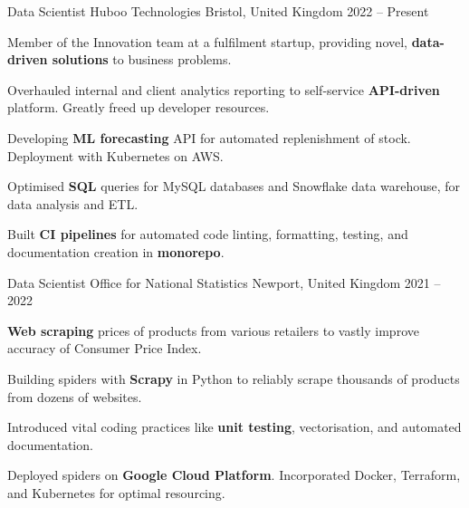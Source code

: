 
\begin{cventries}

        \cventry
        {Data Scientist} %
        {Huboo Technologies} %
        {Bristol, United Kingdom} %
        {2022 -- Present} %
        {
            \begin{cvitems} %
                \item{Member of the Innovation team at a fulfilment startup, providing novel, \textbf{data-driven solutions} to business problems.}
                \item{Overhauled internal and client analytics reporting to self-service \textbf{API-driven} platform. Greatly freed up developer resources.}
                \item{Developing \textbf{ML forecasting} API for automated replenishment of stock. Deployment with Kubernetes on AWS.}
                \item{Optimised \textbf{SQL} queries for MySQL databases and Snowflake data warehouse, for data analysis and ETL.}
                \item{Built \textbf{CI pipelines} for automated code linting, formatting, testing, and documentation creation in \textbf{monorepo}.}
            \end{cvitems}
        }

    \cventry
        {Data Scientist} %
        {Office for National Statistics} %
        {Newport, United Kingdom} %
        {2021 -- 2022} %
        {
            \begin{cvitems} %
                \item{\textbf{Web scraping} prices of products from various retailers to vastly improve accuracy of Consumer Price Index.}
                \item{Building spiders with \textbf{Scrapy} in Python to reliably scrape thousands of products from dozens of websites.}
                \item{Introduced vital coding practices like \textbf{unit testing}, vectorisation, and automated documentation.}
                \item{Deployed spiders on \textbf{Google Cloud Platform}. Incorporated Docker, Terraform, and Kubernetes for optimal resourcing.}
            \end{cvitems}
        }


\end{cventries}
